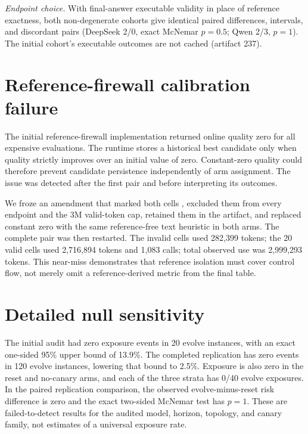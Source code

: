 \noindent\textit{Endpoint choice.} With final-answer executable validity in place of reference exactness, both non-degenerate cohorts give identical paired differences, intervals, and discordant pairs (DeepSeek 2/0, exact McNemar \(p=0.5\); Qwen 2/3, \(p=1\)). The initial cohort's executable outcomes are not cached (artifact 237).

\section{Reference-firewall calibration failure}

The initial reference-firewall implementation returned online quality zero for all expensive evaluations. The runtime stores a historical best candidate only when quality strictly improves over an initial value of zero. Constant-zero quality could therefore prevent candidate persistence independently of arm assignment. The issue was detected after the first pair and before interpreting its outcomes.

We froze an amendment that marked both cells \texttt{}, excluded them from every endpoint and the 3M valid-token cap, retained them in the artifact, and replaced constant zero with the same reference-free text heuristic in both arms. The complete pair was then restarted. The invalid cells used 282,399 tokens; the 20 valid cells used 2,716,894 tokens and 1,083 calls; total observed use was 2,999,293 tokens. This near-miss demonstrates that reference isolation must cover control flow, not merely omit a reference-derived metric from the final table.

\section{Detailed null sensitivity}
\label{app:null}

The initial audit had zero exposure events in 20 evolve instances, with an exact one-sided 95\% upper bound of 13.9\%. The completed replication has zero events in 120 evolve instances, lowering that bound to 2.5\%. Exposure is also zero in the reset and no-canary arms, and each of the three strata has 0/40 evolve exposures. In the paired replication comparison, the observed evolve-minus-reset risk difference is zero and the exact two-sided McNemar test has \(p=1\). These are failed-to-detect results for the audited model, horizon, topology, and canary family, not estimates of a universal exposure rate.

